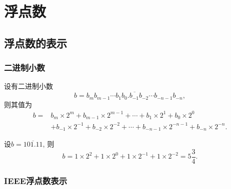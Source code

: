\documentclass{ctexart}
\begin{document}



\section{浮点数} %
\label{sec:浮点数}

\subsection{浮点数的表示} %
\label{sub:浮点数的表示}

\subsubsection{二进制小数} %
\label{ssub:二进制小数}

\begin{finale}
    \begin{definition}[二进制小数的展开]
        设有二进制小数
        \[ b=\overline{b_m b_{m-1} \cdots b_1 b_0.b_{-1}b_{-2}\cdots b_{-n-1}b_{-n}}, \]
        则其值为
        \begin{align*}
            b = & b_m\times 2^m + b_{m-1}\times 2^{m-1} + \cdots + b_1\times 2^1 + b_0\times 2^0 \\
            &+ b_{-1}\times 2^{-1} + b_{-2}\times 2^{-2} + \cdots + b_{-n-1}\times 2^{-n-1} + b_{-n}\times 2^{-n}. 
        \end{align*}
    \end{definition}
\end{finale}
\begin{sample}
    \begin{ex}
        设$b = \overline{101.11}$, 则
        \[ b = 1\times 2^2 + 1\times 2^0 + 1\times 2^{-1} + 1\times 2^{-2} = 5\frac{3}{4}. \]
    \end{ex}
\end{sample}


\subsubsection{IEEE浮点数表示} %
\label{ssub:ieee浮点数表示}

\end{document}
